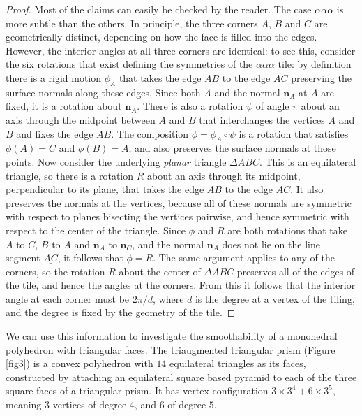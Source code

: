 \documentclass[11pt]{amsart}
\newcommand{\bbn}{\mathbf{n}}
\theoremstyle{remark}
\newcounter{case}
\begin{document}
\begin{proof}
Most of the claims can easily be checked by the reader.   The case $\alpha \alpha \alpha$ is more subtle than the others.
In principle,  the three corners $A$, $B$ and $C$ are geometrically distinct, depending on how the face is filled into the edges.
However,  the interior angles at all three corners are identical:  to see this, consider the six rotations that 
exist defining the symmetries of the $\alpha \alpha \alpha$ tile:  by definition there is a rigid motion $\phi_A$ that takes
 the edge $AB$ to the edge $AC$ preserving the surface normals along these edges.  Since both $A$ and the normal $\bbn_A$ 
 at $A$ are fixed, it is a rotation about  $\bbn_A$.  There is also a rotation $\psi$ of angle $\pi$ about an axis through 
 the midpoint between $A$ and $B$ that interchanges the vertices $A$ and $B$ and fixes the edge $AB$.  
 The composition $\phi = \phi_A \circ \psi$ is a rotation that satisfies $\phi(A) = C$ and $\phi(B) = A$, and also preserves the surface normals at those points.   Now consider the underlying \emph{planar} triangle $\Delta ABC$. This is an equilateral triangle, so there is a rotation $R$ about an axis through its midpoint, perpendicular to its plane, that takes the edge $AB$ to the edge $AC$.  It also preserves the  normals at the vertices, because all of these normals  are symmetric with respect to planes bisecting the vertices pairwise, and hence symmetric with respect to 
 the center of the triangle.  Since  $\phi$ and $R$ are both rotations that take $A$ to $C$, $B$ to $A$ and $\bbn_A$ to $\bbn_C$, and the normal $\bbn_A$ does not lie on the line segment $\underline{AC}$, it follows that $\phi=R$.
 The same argument applies to any of the corners, so the rotation $R$ about the center of $\Delta ABC$ preserves all
 of the edges of the tile, and hence the angles at the corners.  From this it follows that the interior angle at each corner must be $2\pi/d$, where $d$ is the degree at a vertex of the tiling, and the degree is fixed by the geometry of the tile.
\end{proof}

We can use this information to investigate the smoothability of a monohedral polyhedron with triangular faces.
The triaugmented triangular prism (Figure \ref{fig3}) is a convex polyhedron with $14$ equilateral triangles as its faces, constructed by attaching an equilateral square based pyramid to each of the three square faces of a triangular prism.  It has 
vertex configuration
$3 \times 3^4 + 6 \times 3^5$, meaning $3$ vertices of degree $4$, and $6$ of degree $5$.
\end{document}
